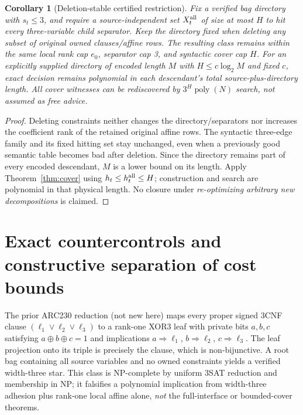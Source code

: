 \documentclass[10pt]{article}
\newtheorem{corollary}[theorem]{Corollary}
\newcommand{\poly}{\operatorname{poly}}
\begin{document}
\begin{corollary}[Deletion-stable certified restriction]\label{cor:hereditary}
Fix a verified bag directory with $s_t\le3$, and require a source-independent set $X_t^{\rm all}$ of size at most $H$ to hit \emph{every} three-variable child separator. Keep the directory fixed when deleting any subset of original owned clauses/affine rows. The resulting class remains within the same local rank cap $e_0$, separator cap 3, and syntactic cover cap $H$. For an explicitly supplied directory of encoded length $M$ with $H\le c\log_2 M$ and fixed $c$, exact decision remains polynomial in each descendant's total source-plus-directory length. All cover witnesses can be rediscovered by $3^H\poly(N)$ search, not assumed as free advice.
\end{corollary}
\begin{proof}
Deleting constraints neither changes the directory/separators nor increases the coefficient rank of the retained original affine rows. The syntactic three-edge family and its fixed hitting set stay unchanged, even when a previously good semantic table becomes bad after deletion. Since the directory remains part of every encoded descendant, $M$ is a lower bound on its length. Apply Theorem~\ref{thm:cover} using $h_t\le h_t^{\rm all}\le H$; construction and search are polynomial in that physical length. No closure under \emph{re-optimizing arbitrary new decompositions} is claimed.\end{proof}

\section{Exact countercontrols and constructive separation of cost bounds}
The prior ARC230 reduction (not new here) maps every proper signed 3CNF clause $(\ell_1\vee\ell_2\vee\ell_3)$ to a rank-one XOR3 leaf with private bits $a,b,c$ satisfying $a\oplus b\oplus c=1$ and implications $a\Rightarrow\ell_1$, $b\Rightarrow\ell_2$, $c\Rightarrow\ell_3$. The leaf projection onto its triple is precisely the clause, which is non-bijunctive. A root bag containing all source variables and no owned constraints yields a verified width-three star. This class is NP-complete by uniform 3SAT reduction and membership in NP; it falsifies a polynomial implication from width-three adhesion plus rank-one local affine alone, \emph{not} the full-interface or bounded-cover theorems.
\end{document}
